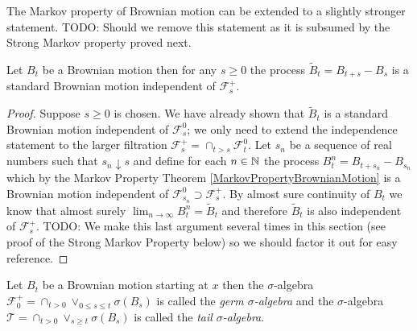 The Markov property of Brownian motion can be extended to a slightly
stronger statement.   TODO: Should we remove this statement as it is
subsumed by the Strong Markov property proved next.
\begin{thm}\label{ExtendedMarkovPropertyBrownianMotion}Let $B_t$ be a
  Brownian motion then for any $s \geq 0$ the process $\tilde{B}_t = B_{t + s} -
  B_s$ is a standard Brownian motion independent of $\mathcal{F}^+_s$.
\end{thm}
\begin{proof}
Suppose $s \geq 0$ is chosen.  We have already shown that $\tilde{B}_t$ is a standard Brownian motion
independent of $\mathcal{F}^0_s$; we only need to extend the independence
statement to the larger filtration $\mathcal{F}^+_s = \cap_{t > s}
\mathcal{F}^0_t$.  Let $s_n$ be a sequence of real numbers such that
$s_n \downarrow s$ and define for each $n \in \mathbb{N}$ the process $B^n_t
= B_{t+s_n} - B_{s_n}$ which by the Markov Property Theorem
\ref{MarkovPropertyBrownianMotion} is a Brownian motion independent of
$\mathcal{F}^0_{s_n} \supset \mathcal{F}^+_{s} $.  By almost sure continuity of $B_t$ we know
that almost surely $\lim_{n \to \infty} B^n_t = \tilde{B}_t$ and therefore
$\tilde{B}_t$ is also independent of $\mathcal{F}^+_{s}$.  TODO: We make
this last argument several times in this section (see proof of the
Strong Markov Property below) so we should factor it out for easy reference.
\end{proof}

\begin{defn}Let $B_t$ be a Brownian motion starting at $x$ then the
  $\sigma$-algebra $\mathcal{F}^+_0 = \cap_{t>0}
  \vee_{0 \leq s \leq t} \sigma(B_s)$ is called the \emph{germ
    $\sigma$-algebra} and the $\sigma$-algebra $\mathcal{T} = \cap_{t > 0} \vee_{s \geq
    t} \sigma(B_s)$ is called the
  \emph{tail $\sigma$-algebra}.
\end{defn}

